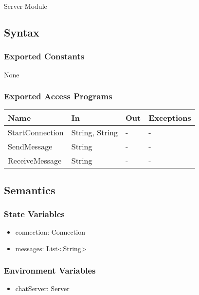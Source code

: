 \documentclass[12pt, titlepage]{article}
\begin{document}
Server Module

\subsection{Syntax}

\subsubsection{Exported Constants}

None

\subsubsection{Exported Access Programs}

\begin{center}
\begin{tabular}{p{4cm} p{3cm} p{3cm} p{4cm}}
\hline
\textbf{Name} & \textbf{In} & \textbf{Out} & \textbf{Exceptions} \\
\hline
StartConnection & String, String & - & - \\
SendMessage & String & - & - \\
ReceiveMessage & String & - & - \\

\hline
\end{tabular}
\end{center}

\subsection{Semantics}

\subsubsection{State Variables}

\begin{itemize}
\item connection: Connection
\item messages: List\textless String\textgreater
\end{itemize}

\subsubsection{Environment Variables}

\begin{itemize}
\item chatServer: Server
\end{itemize}
\end{document}

